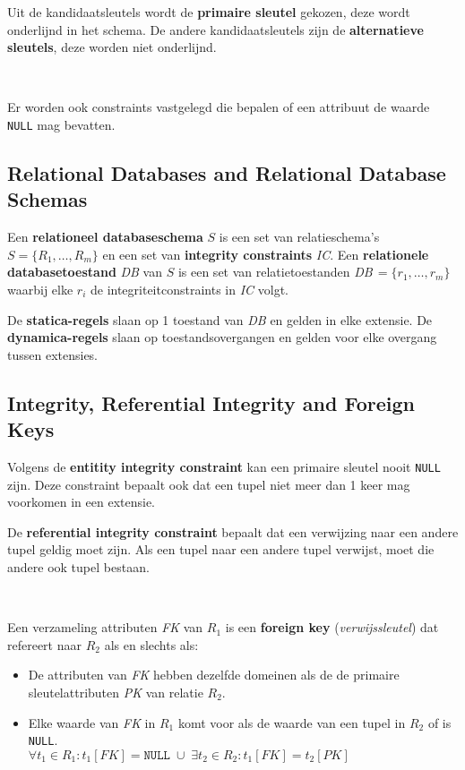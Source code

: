 Uit de kandidaatsleutels wordt de \textbf{primaire sleutel} gekozen, deze wordt onderlijnd in het schema. De andere kandidaatsleutels zijn de \textbf{alternatieve sleutels}, deze worden niet onderlijnd.

~

\noindent Er worden ook constraints vastgelegd die bepalen of een attribuut de waarde \texttt{NULL} mag bevatten.

\subsection{Relational Databases and Relational Database Schemas}
Een \textbf{relationeel databaseschema} $S$ is een set van relatieschema's $S = \{R_1, \dots, R_m\}$ en een set van \textbf{integrity constraints} \textit{IC}. Een \textbf{relationele databasetoestand} \textit{DB} van $S$ is een set van relatietoestanden \textit{DB}$\,= \{r_1, \dots, r_m\}$ waarbij elke $r_i$ de integriteitconstraints in \textit{IC} volgt.

De \textbf{statica-regels} slaan op 1 toestand van \textit{DB} en gelden in elke extensie. De \textbf{dynamica-regels} slaan op toestandsovergangen en gelden voor elke overgang tussen extensies.

\subsection{Integrity, Referential Integrity and Foreign Keys}
Volgens de \textbf{entitity integrity constraint} kan een primaire sleutel nooit \texttt{NULL} zijn. Deze constraint bepaalt ook dat een tupel niet meer dan 1 keer mag voorkomen in een extensie.

De \textbf{referential integrity constraint} bepaalt dat een verwijzing naar een andere tupel geldig moet zijn. Als een tupel naar een andere tupel verwijst, moet die andere ook tupel bestaan.

~

\noindent Een verzameling attributen \textit{FK} van $R_1$ is een \textbf{foreign key} (\textit{verwijssleutel}) dat refereert naar $R_2$ als en slechts als:
\begin{itemize}
	\item De attributen van \textit{FK} hebben dezelfde domeinen als de de primaire sleutelattributen \textit{PK} van relatie $R_2$.
	\item Elke waarde van \textit{FK} in $R_1$ komt voor als de waarde van een tupel in $R_2$ of is \texttt{NULL}.\\
	$\forall t_1 \in R_1 : t_1[\mathit{FK}] = \mathtt{NULL} \; \cup \; \exists t_2 \in R_2 :  t_1[\mathit{FK}] = t_2[\mathit{PK}]$
\end{itemize}

